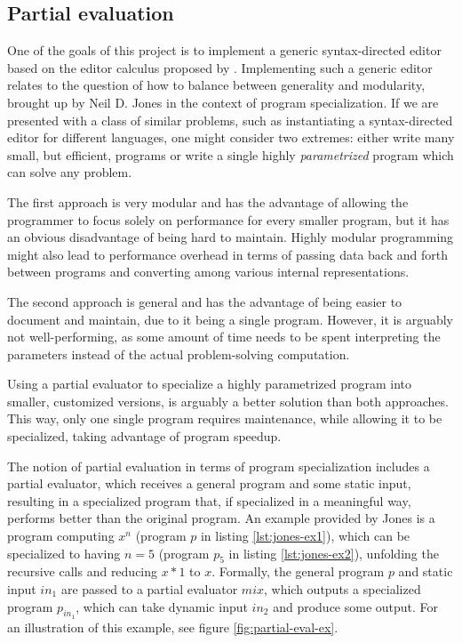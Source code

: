 \subsection{Partial evaluation}
One of the goals of this project is to implement a generic syntax-directed editor based on the editor calculus proposed by \cite{aalborg}. Implementing such a generic editor relates to the question of how to balance between generality and modularity, brought up by Neil D. Jones\cite{jones-partial-evaluation} in the context of program specialization. If we are presented with a class of similar problems, such as instantiating a syntax-directed editor for different languages, one might consider two extremes: either write many small, but efficient, programs or write a single highly \textit{parametrized} program which can solve any problem.

The first approach is very modular and has the advantage of allowing the programmer to focus solely on performance for every smaller program, but it has an obvious disadvantage of being hard to maintain. Highly modular programming might also lead to performance overhead in terms of passing data back and forth between programs and converting among various internal representations.

The second approach is general and has the advantage of being easier to document and maintain, due to it being a single program. However, it is arguably not well-performing, as some amount of time needs to be spent interpreting the parameters instead of the actual problem-solving computation.

Using a partial evaluator\cite{jones96} to specialize a highly parametrized program into smaller, customized versions, is arguably a better solution than both approaches. This way, only one single program requires maintenance, while allowing it to be specialized, taking advantage of program speedup.

The notion of partial evaluation in terms of program specialization\cite{jones96} includes a partial evaluator, which receives a general program and some static input, resulting in a specialized program that, if specialized in a meaningful way, performs better than the original program. An example provided by Jones is a program computing $x^n$ (program $p$ in listing \ref{lst:jones-ex1}), which can be specialized to having $n = 5$ (program $p_5$ in listing \ref{lst:jones-ex2}), unfolding the recursive calls and reducing $x*1$ to $x$. Formally, the general program $p$ and static input $in_1$ are passed to a partial evaluator $mix$, which outputs a specialized program $p_{in_1}$, which can take dynamic input $in_2$ and produce some output. For an illustration of this example, see figure \ref{fig:partial-eval-ex}.

